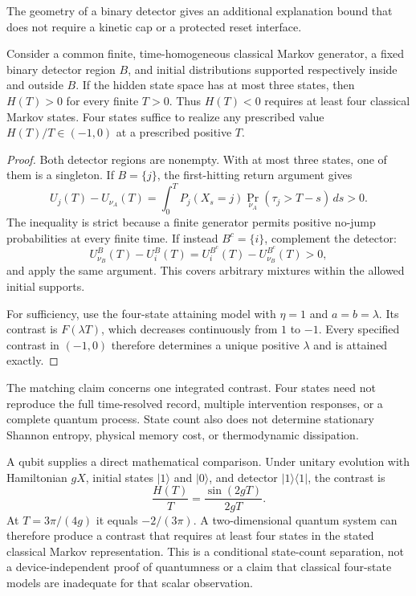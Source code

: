 The geometry of a binary detector gives an additional explanation bound that
does not require a kinetic cap or a protected reset interface.
\begin{theorem}
\label{rr:dimension}
Consider a common finite, time-homogeneous classical Markov generator, a fixed
binary detector region $B$, and initial distributions supported respectively
inside and outside $B$. If the hidden state space has at most three states,
then $H(T)>0$ for every finite $T>0$. Thus $H(T)<0$ requires at least four
classical Markov states. Four states suffice to realize any prescribed value
$H(T)/T\in(-1,0)$ at a prescribed positive $T$.
\end{theorem}
\begin{proof}
Both detector regions are nonempty. With at most three states, one of them is a
singleton. If $B=\{j\}$, the first-hitting return argument gives
\[
 U_j(T)-U_{\nu_A}(T)
 =\int_0^T P_j(X_s=j)\Pr_{\nu_A}(\tau_j>T-s)\,ds>0.
\]
The inequality is strict because a finite generator permits positive no-jump
probabilities at every finite time. If instead $B^c=\{i\}$, complement the
detector:
\[
 U^B_{\nu_B}(T)-U^B_i(T)
 =U^{B^c}_i(T)-U^{B^c}_{\nu_B}(T)>0,
\]
and apply the same argument. This covers arbitrary mixtures within the allowed
initial supports.

For sufficiency, use the four-state attaining model with $\eta=1$ and
$a=b=\lambda$. Its contrast is $F(\lambda T)$, which decreases continuously
from $1$ to $-1$. Every specified contrast in $(-1,0)$ therefore determines a
unique positive $\lambda$ and is attained exactly.
\end{proof}

The matching claim concerns one integrated contrast. Four states need not
reproduce the full time-resolved record, multiple intervention responses, or
a complete quantum process. State count also does not determine stationary
Shannon entropy, physical memory cost, or thermodynamic dissipation.

A qubit supplies a direct mathematical comparison. Under unitary evolution
with Hamiltonian $gX$, initial states $|1\rangle$ and $|0\rangle$, and detector
$|1\rangle\langle1|$, the contrast is
\[
 \frac{H(T)}{T}=\frac{\sin(2gT)}{2gT}.
\]
At $T=3\pi/(4g)$ it equals $-2/(3\pi)$. A two-dimensional quantum system can
therefore produce a contrast that requires at least four states in the stated
classical Markov representation. This is a conditional state-count separation,
not a device-independent proof of quantumness or a claim that classical
four-state models are inadequate for that scalar observation.

